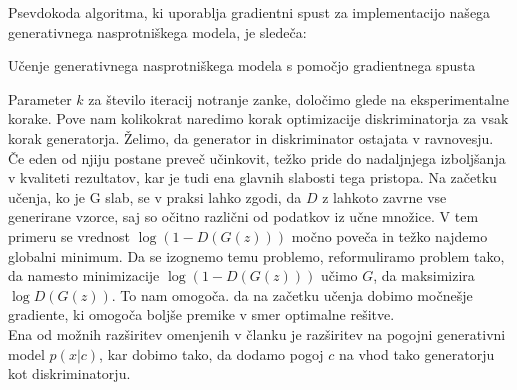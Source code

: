 \documentclass[12pt,a4paper,twoside]{article}
\theoremstyle{definition} %
\theoremstyle{plain} %
\numberwithin{equation}{section}  %
\begin{document}
Psevdokoda algoritma, ki uporablja gradientni spust za implementacijo našega generativnega nasprotniškega modela, je sledeča: 
\begin{algorithm}
\caption{Učenje generativnega nasprotniškega modela s pomočjo gradientnega spusta}\label{euclid}
\begin{algorithmic}[1]
\EndFor
\EndFor
\end{algorithmic}
\end{algorithm}

Parameter $k$ za število iteracij notranje zanke, določimo glede na eksperimentalne korake. Pove nam kolikokrat naredimo korak optimizacije diskriminatorja za vsak korak generatorja. 
Želimo, da generator in diskriminator ostajata v ravnovesju. Če eden od njiju postane preveč učinkovit, težko pride do nadaljnjega izboljšanja v kvaliteti rezultatov, kar je tudi ena glavnih slabosti tega pristopa.  
Na začetku učenja, ko je G slab, se v praksi lahko zgodi, da $D$ z lahkoto zavrne vse generirane vzorce, saj so očitno različni od podatkov iz učne množice. V tem primeru se vrednost $\log(1-D(G(z)))$ močno poveča in težko najdemo globalni minimum. Da se izognemo temu problemo, reformuliramo problem tako, da namesto minimizacije  $\log(1-D(G(z)))$ učimo $G$, da maksimizira $\log{D(G(z))}$. To nam omogoča. da na začetku učenja dobimo močnešje gradiente, ki omogoča boljše premike v smer optimalne rešitve. 
\\
Ena od možnih razširitev omenjenih v članku je razširitev na pogojni generativni model $p(x | c)$, kar  dobimo tako, da dodamo pogoj $c$ na vhod tako generatorju kot diskriminatorju.  
\end{document}

